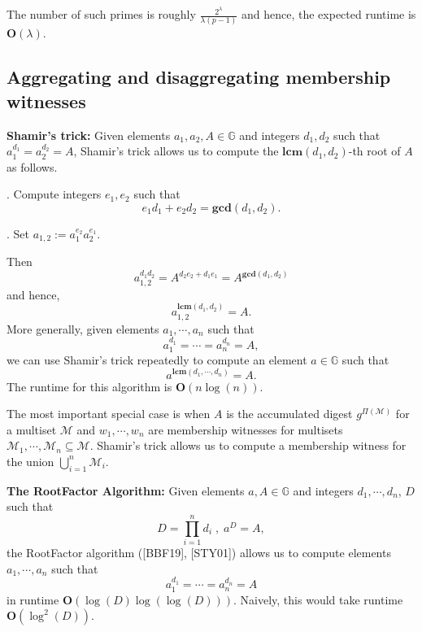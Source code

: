 \documentclass[11pt, lettersize, notitlepage, leqno, footskip=0.6cm]{article}
\newcommand{\bz}{\mathbb Z}
\newcommand{\pl}{\prod\limits}
\newcommand{\slim}{\sum\limits}
\newcommand{\mc}{\mathcal}
\newcommand{\mb}{\mathbb}
\newcommand{\mbf}{\mathbf}
\newcommand{\lam}{\lambda}
\newcommand{\sub}{\subseteq}
\newcommand{\vs}{\vspace{-0.15cm}}
\newcommand{\noin}{\noindent}
\newcommand{\op}{overwhelming probability}
\newcommand{\LCM}{\mbf{lcm}}
\newcommand{\GCD}{\mbf{gcd}}
\numberwithin{equation}{section}
\begin{document}
\noin The number of such primes is roughly \vs $\frac{2^{\lam}}{\lam (p-1)}$ and hence, the expected runtime is $\mbf{O}(\lam)$.






\subsection{\fontsize{11}{11} Aggregating and disaggregating membership witnesses}

\noindent \textbf{Shamir's trick:} Given elements $a_1, a_2, A\in \mb{G}$ and integers $d_1, d_2$ such that $a_1^{d_1} = a_2^{d_2} = A$, Shamir's trick allows us to compute the $\LCM(d_1, d_2)$-th root of $A$ as follows.

. Compute integers $e_1, e_2$ such that \vs $$e_1d_1+e_2d_2 = \GCD(d_1, d_2).$$

. Set $a_{1,2}:= a_1^{e_2}a_2^{e_1} $. 

\noindent Then \vspace{-0.15cm}$$a_{1,2}^{d_1d_2} = A^{d_2e_2 + d_1e_1} = A^{\GCD(d_1,d_2)}$$ and hence, \vspace{-0.15cm}$$a_{1,2}^{\LCM(d_1,d_2)} = A.$$ More generally, given elements $a_1,\cdots,a_n$ such that \vs $$a_1^{d_1} = \cdots = a_n^{d_n} = A, $$ we can use Shamir's trick repeatedly to compute an element $a\in\mb{G}$ such that \vs $$a^{\LCM(d_1,\cdots,d_n)} = A.$$ The runtime for this algorithm is $\mbf{O}(n\log(n))$.

The most important special case is when $A$ is the accumulated digest $g^{\Pi(\mc{M})}$ for a multiset $\mc{M}$ and $w_1,\cdots,w_n$ are membership witnesses for multisets $\mc{M}_1,\cdots,\mc{M}_n\sub \mc{M}$. Shamir's trick allows us to compute a membership witness for the union $\bigcup\limits_{i=1}^n \mc{M}_i$. 

\begin{comment} Conversely, for any element $b = \pl_{i=1}^n a_i^{x_i}$ $(x_i\in\bz)$, we have \vs $$ b^{\LCM(d_1,\cdots,d_n)} = A^{\slim_{i=1}^n  \frac{\LCM(d_1,\cdots,d_n)x_i}{d_i}} $$ and the low order assumption implies that with \op, \vs $$b =  a^{\slim_{i=1}^n  \frac{\LCM(d_1,\cdots,d_n)x_i}{d_i}}.$$ Thus, $b$ is expressible as a power of $a$. 

\end{comment}

\vspace{0.2cm}


\noindent \textbf{The RootFactor Algorithm:} Given elements $a, A\in\mb{G}$ and integers $d_1,\cdots, d_n$, $D$ such that \vs $$D= \pl_{i=1}^n d_i\; ,\; a^{D} = A,$$ the RootFactor algorithm ([BBF19], [STY01]) allows us to compute elements $a_1,\cdots, a_n$ such that \vs $$a_1^{d_1}=\cdots = a_n^{d_n} = A$$ in runtime $\mbf{O}(\log(D)\log(\log(D)))$. Naively, this would take runtime $\mbf{O}(\log^2(D))$.
\end{document}
